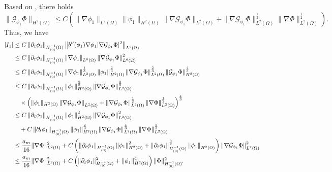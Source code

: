 \documentclass[11pt,reqno]{amsart}
\theoremstyle{remark}
\newcommand \norm[1] {\left\Vert #1\right\Vert}
\def\G{\mathcal{G}}
\numberwithin{equation}{section}
\begin{document}
Based on \cite[Eqn. (3.46)]{CGGG2025}, there holds
\begin{equation*}
\label{H2-Phi}
\| \mathcal{G}_{\phi_1} \Phi\|_{H^2(\Omega)}
\leq C \left( \| \nabla \phi_1\|_{L^2(\Omega)}
 \| \phi_1\|_{H^2(\Omega)}
 \| \nabla \mathcal{G}_{\phi_1} \Phi\|_{L^2(\Omega)}+
 \| \nabla \mathcal{G}_{\phi_1} \Phi \|_{L^2(\Omega)}^\frac12
 \| \nabla \Phi\|_{L^2(\Omega)}^\frac12\right)\!.
\end{equation*}
Thus, we have
\begin{align*}
|I_1|&\leq C  \norm{\partial_t \phi_1}_{ H^{-1}_{(0)}(\Omega)}
\norm{ b''(\phi_1)  \nabla \phi_1 |\nabla \G_{\phi_1} \Phi |^2}_{L^2(\Omega)}\!
\\
&\leq
C \norm{\partial_t \phi_1}_{H^{-1}_{(0)}(\Omega)}
\norm{\nabla \phi_1}_{L^6(\Omega)}
\norm{\nabla \G_{\phi_1} \Phi}_{L^6(\Omega)}^2
\notag
\\
&\leq
C \norm{\partial_t \phi_1}_{H^{-1}_{(0)}(\Omega)}
\norm{\nabla \phi_1}_{L^2(\Omega)}^\frac13 \norm{\phi_1}_{H^2(\Omega)}^\frac23
\norm{\nabla \G_{\phi_1} \Phi}_{L^2(\Omega)}^\frac23
\norm{\G_{\phi_1} \Phi}_{H^2(\Omega)}^\frac43
\notag
\\
&\leq C \norm{\partial_t \phi_1}_{H^{-1}_{(0)}(\Omega)}
 \norm{\phi_1}_{H^2(\Omega)}^\frac23
\norm{\nabla \G_{\phi_1} \Phi}_{L^2(\Omega)}^\frac23
\notag
\\
&\quad \times
\left( \| \phi_1\|_{H^2(\Omega)} \norm{\nabla \G_{\phi_1} \Phi}_{L^2(\Omega)} + \norm{\nabla \G_{\phi_1} \Phi}_{L^2(\Omega)}^\frac12 \| \nabla \Phi\|_{L^2(\Omega)}^\frac12 \right)^\frac43
\notag
\\
& \leq
C \norm{\partial_t \phi_1}_{H^{-1}_{(0)}(\Omega)}
 \norm{\phi_1}_{H^2(\Omega)}^2
\norm{\nabla \G_{\phi_1} \Phi}_{L^2(\Omega)}^2
\notag
\\
&\quad
+
C \norm{\partial_t \phi_1}_{H^{-1}_{(0)}(\Omega)}
 \norm{\phi_1}_{H^2(\Omega)}^\frac23
\norm{\nabla \G_{\phi_1} \Phi}_{L^2(\Omega)}^\frac43
 \| \nabla \Phi\|_{L^2(\Omega)}^\frac23
 \notag
 \\
& \leq \frac{a_m}{16} \| \nabla \Phi\|_{L^2(\Omega)}^2
 + C  \left( \norm{\partial_t \phi_1}_{H^{-1}_{(0)}(\Omega)}
 \norm{\phi_1}_{H^2(\Omega)}^2 + \norm{\partial_t \phi_1}_{H^{-1}_{(0)}(\Omega)}^\frac32
 \norm{\phi_1}_{H^2(\Omega)}\right) \norm{\nabla \G_{\phi_1} \Phi}_{L^2(\Omega)}^2
 \notag
 \\
 \label{I1-f}
& \leq \frac{a_m}{16} \| \nabla \Phi\|_{L^2(\Omega)}^2
 + C \left( \norm{\partial_t \phi_1}_{H^{-1}_{(0)}(\Omega)}^2+
 \norm{\phi_1}_{H^2(\Omega)}^4 \right)\|\Phi\|_{H^{-1}_{(0)}(\Omega)}^{2}\!.
\end{align*}
\end{document}

